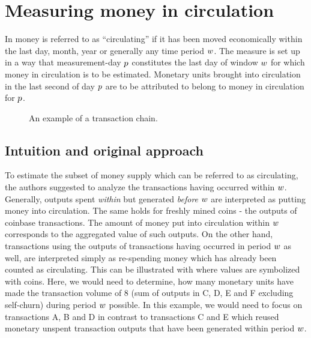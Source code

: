 \section{Measuring money in circulation}
\label{sec:measure}%

In \cite{pernice2019cryptocurrencies} %
money is referred to as ``circulating'' if it has been moved economically within the last day, month, year or generally any time period ${w}$.%
The measure is set up in a way that measurement-day \({p}\) constitutes the last day of window \({w}\) for which money in circulation is to be estimated. %
Monetary units brought into circulation in the last second of day \({p}\) are to be attributed to belong to money in circulation for \({p}\). %

\begin{figure}[ht!]%
	\centering
	\ifdefined\varInputFigs%
	
	\else%
	\fi%
	\caption{%
		An example of a transaction chain. %
	}%
	\label{fig:mcirc_concept}%
\end{figure}%


\subsection{Intuition and original approach}
\label{sec:orig_approach}%
To estimate the subset of money supply which can be referred to as circulating, the authors suggested to analyze the transactions having occurred within ${w}$. %
Generally, outputs spent \emph{within} but generated \emph{before} \({w}\) are interpreted as putting money into circulation. %
The same holds for freshly mined coins - the outputs of coinbase transactions. %
The amount of money put into circulation within \({w}\) corresponds to the aggregated value of such outputs. %
On the other hand, transactions using the outputs of transactions having occurred in period ${w}$ as well, are interpreted simply as re-spending money which has already been counted as circulating.%
%
This can be illustrated with  where values are symbolized with coins. %
Here, we would need to determine, how many monetary units have made the transaction volume of $8$ (sum of outputs in C, D, E and F excluding self-churn) during period ${w}$ possible. %
In this example, we would need to focus on transactions A, B and D in contrast to transactions C and E which reused monetary unspent transaction outputs that have been generated within period ${w}$. %

